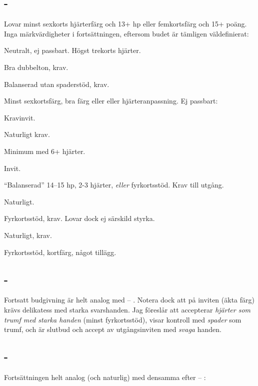 \subsection{ - }

Lovar minst sexkorts hjärterfärg och 13+ hp eller femkortsfärg och 15+ poäng. 
Inga märk\-vär\-dig\-he\-ter i fortsättningen,
eftersom budet är tämligen väl\-de\-fi\-ni\-e\-rat:

\bbe
   \item[\hj{2}] Neutralt, ej passbart. Högst trekorts hjärter. 
	\bbe
	   \item[--\spa{2}] Bra dubbelton, krav.
	   \item[--\NT{2}] Balanserad utan spaderstöd, krav.
	\ebe
   \item[\spa{2}] Minst sexkortsfärg, bra färg eller eller hjärteranpassning.
		 Ej passbart: 
		\bbe
		   \item[--\NT{2}] Kravinvit.
		   \item[--\la{3}] Naturligt krav.
		   \item[--\hj{3}] Minimum med 6+ hjärter.
		   \item[--\spa{3}] Invit.
		\ebe
   \item[\NT{2}] ``Balanserad'' 14--15 hp, 2-3 hjärter, {\em eller}
fyrkortsstöd. Krav till utgång. 
   \item[\la{3}] Naturligt.
   \item[\hj{3}] Fyrkortsstöd, krav. Lovar dock ej särskild styrka.
   \item[\spa{3}] Naturligt, krav.
   \item[\la{4}] Fyrkortsstöd, kortfärg, något tillägg. 
\ebe

\subsection{ - }

Fortsatt budgivning är helt analog med  -- . Notera dock att på
inviten  (äkta färg) krävs delikatess med starka svarshanden. Jag
föreslår att  accepterar \emph{hjärter som trumf med starka handen} (minst
fyrkortsstöd),  visar kontroll med \emph{spader} som trumf, och 
är slutbud och accept av utgångsinviten med \emph{svaga} handen. 

\subsection{ - }

Fortsättningen helt analog (och naturlig) med densamma efter  -- :
